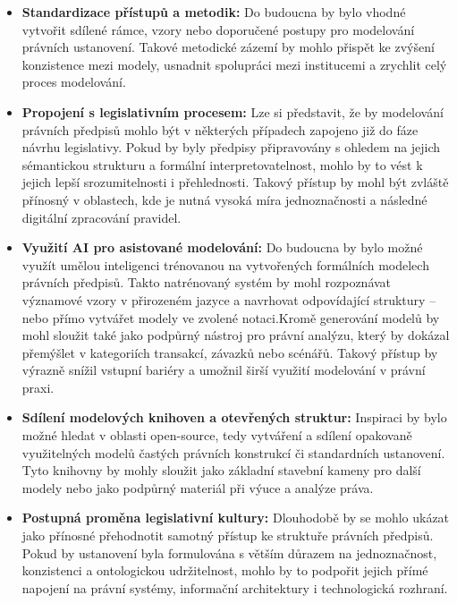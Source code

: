 \begin{itemize}
  \item \textbf{Standardizace přístupů a metodik:} Do budoucna by bylo vhodné vytvořit sdílené rámce, vzory nebo doporučené postupy pro modelování právních ustanovení. Takové metodické zázemí by mohlo přispět ke zvýšení konzistence mezi modely, usnadnit spolupráci mezi institucemi a zrychlit celý proces modelování.

  \item \textbf{Propojení s legislativním procesem:} Lze si představit, že by modelování právních předpisů mohlo být v některých případech zapojeno již do fáze návrhu legislativy. Pokud by byly předpisy připravovány s ohledem na jejich sémantickou strukturu a formální interpretovatelnost, mohlo by to vést k jejich lepší srozumitelnosti i přehlednosti. Takový přístup by mohl být zvláště přínosný v oblastech, kde je nutná vysoká míra jednoznačnosti a následné digitální zpracování pravidel.

  \item \textbf{Využití AI pro asistované modelování:} Do budoucna by bylo možné využít umělou inteligenci trénovanou na vytvořených formálních modelech právních předpisů. Takto natrénovaný systém by mohl rozpoznávat významové vzory v přirozeném jazyce a navrhovat odpovídající struktury – nebo přímo vytvářet modely ve zvolené notaci.Kromě generování modelů by mohl sloužit také jako podpůrný nástroj pro právní analýzu, který by dokázal přemýšlet v kategoriích transakcí, závazků nebo scénářů. Takový přístup by výrazně snížil vstupní bariéry a umožnil širší využití modelování v právní praxi.

  \item \textbf{Sdílení modelových knihoven a otevřených struktur:} Inspiraci by bylo možné hledat v oblasti open-source, tedy vytváření a sdílení opakovaně využitelných modelů častých právních konstrukcí či standardních ustanovení. Tyto knihovny by mohly sloužit jako základní stavební kameny pro další modely nebo jako podpůrný materiál při výuce a analýze práva.

  \item \textbf{Postupná proměna legislativní kultury:} Dlouhodobě by se mohlo ukázat jako přínosné přehodnotit samotný přístup ke struktuře právních předpisů. Pokud by ustanovení byla formulována s větším důrazem na jednoznačnost, konzistenci a ontologickou udržitelnost, mohlo by to podpořit jejich přímé napojení na právní systémy, informační architektury i technologická rozhraní.
\end{itemize}

